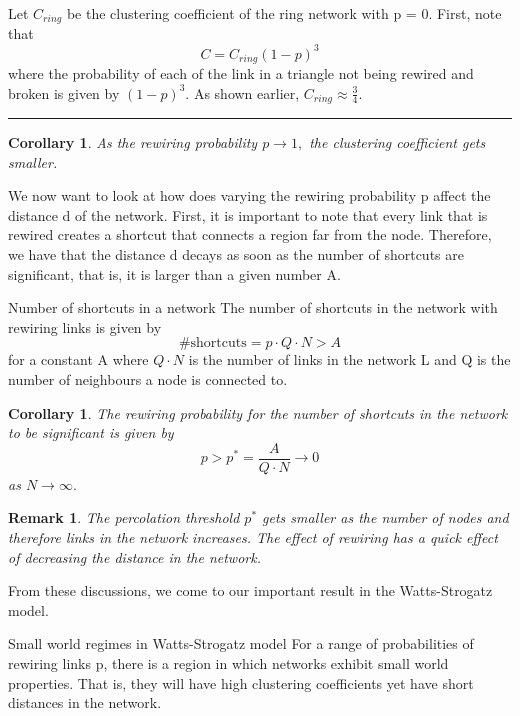 \documentclass[twoside]{article}
\newtheorem{corollary}[theorem]{Corollary}
\newtheorem{remark}[theorem]{Remark}
\newenvironment{proof}{{\bf Proof:}}{\hfill\rule{2mm}{2mm}}
\begin{document}
\begin{proof}  Let $C_{ring}$ be the clustering coefficient of the ring network with p = 0. First, note that 
$$
C = C_{ring}(1 - p)^3
$$
where the probability of each of the link in a triangle not being rewired and broken is given by $(1 - p)^3.$ As shown earlier, $C_{ring} \approx \frac{3}{4}.$
\end{proof}
\begin{corollary} As the rewiring probability $p \rightarrow 1,$ the clustering coefficient gets smaller.
\end{corollary}
\newpage
We now want to look at how does varying the rewiring probability p affect the distance d of the network. First, it is important to note that every link that is rewired creates a shortcut that connects a region far from the node. Therefore, we have that the distance d decays as soon as the number of shortcuts are significant, that is, it is larger than a given number A.

\begin{proposition_exam}{Number of shortcuts in a network}{} The number of shortcuts in the network with rewiring links is given by 
$$
\text{\# shortcuts} = p\cdot Q\cdot N  > A
$$
for a constant A where $Q \cdot N$ is the number of links in the network L and Q is the number of neighbours a node is connected to.
\end{proposition_exam}

\begin{corollary}The rewiring probability for the number of shortcuts in the network to be significant is given by 
$$
p > p^* = \frac{A}{Q\cdot N} \rightarrow 0
$$
as $N \rightarrow \infty.$
\end{corollary}

\begin{remark} The percolation threshold $p^*$ gets smaller as the number of nodes and therefore links in the network increases. The effect of rewiring has a quick effect of decreasing the distance in the network.
\end{remark}

From these discussions, we come to our important result in the Watts-Strogatz model.
\begin{theorem_exam}{Small world regimes in Watts-Strogatz model}{} For a range of probabilities of rewiring links p, there is a region in which networks exhibit small world properties. That is, they will have high clustering coefficients yet have short distances in the network.
\end{theorem_exam}
\end{document}
